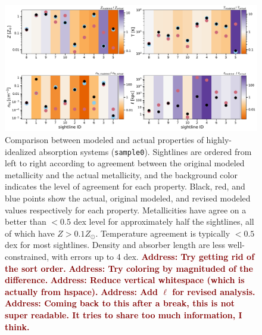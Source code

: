 \documentclass[fleqn,usenatbib]{mnras}
\newcommand{\todo}[1]{\textcolor{Maroon}{\textbf{Address: #1}}}
\begin{document}
\begin{figure}
    \centering
    \includegraphics[width=\textwidth]{figures/sample0/comparison.pdf}
    \caption{
    Comparison between modeled and actual properties of highly-idealized absorption systems (\texttt{sample0}).
    Sightlines are ordered from left to right according to agreement between the original modeled metallicity and the actual metallicity, and the background color indicates the level of agreement for each property.
    Black, red, and blue points show the actual, original modeled, and revised modeled values respectively for each property.
    Metallicities have agree on a better than $<0.5$ dex level for approximately half the sightlines, all of which have $Z > 0.1 Z_\odot$.
    Temperature agreement is typically $<0.5$ dex for most sightlines.
    Density and absorber length are less well-constrained, with errors up to 4 dex.
    \todo{Try getting rid of the sort order.}
    \todo{Try coloring by magnituded of the difference.}
    \todo{Reduce vertical whitespace (which is actually from hspace).}
    \todo{Add $\ell$ for revised analysis.}
    \todo{Coming back to this after a break, this is not super readable.
    It tries to share too much information, I think.}
    }
    \label{f: idealized}
\end{figure}
\end{document}

